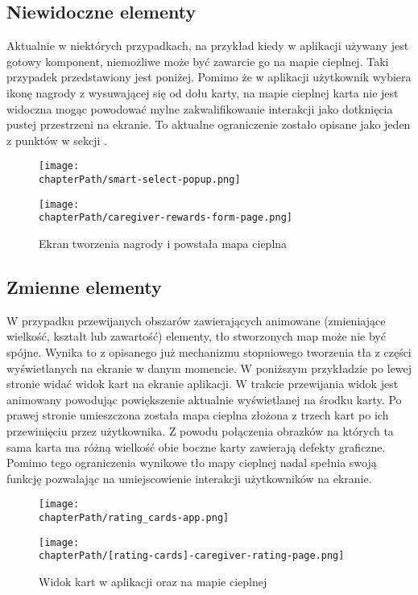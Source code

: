 \subsection{Niewidoczne elementy}
Aktualnie w niektórych przypadkach, na przykład kiedy w aplikacji używany jest gotowy komponent, niemożliwe może być zawarcie go na mapie cieplnej. Taki przypadek przedstawiony jest poniżej. Pomimo że w aplikacji użytkownik wybiera ikonę nagrody z wysuwającej się od dołu karty, na mapie cieplnej karta nie jest widoczna mogąc powodować mylne zakwalifikowanie interakcji jako dotknięcia pustej przestrzeni na ekranie. To aktualne ograniczenie zostało opisane jako jeden z punktów w sekcji .

\bigskip
\begin{figure}[H]
\centering
\begin{minipage}{.3\textwidth}
	\centering
	\texttt{[image: \\chapterPath/smart-select-popup.png]}
\end{minipage}
\begin{minipage}{.3\textwidth}
	\centering
	\texttt{[image: \\chapterPath/caregiver-rewards-form-page.png]}
\end{minipage}
\bigskip
\caption{Ekran tworzenia nagrody i powstała mapa cieplna}
\label{fig:rs_reward_form}
\end{figure}

\subsection{Zmienne elementy}
W przypadku przewijanych obszarów zawierających animowane (zmieniające wielkość, kształt lub zawartość) elementy, tło stworzonych map może nie być spójne. Wynika to z opisanego już mechanizmu stopniowego tworzenia tła z części wyświetlanych na ekranie w danym momencie. W poniższym przykładzie po lewej stronie widać widok kart na ekranie aplikacji. W trakcie przewijania widok jest animowany powodując powiększenie aktualnie wyświetlanej na środku karty. Po prawej stronie umieszczona została mapa cieplna złożona z trzech kart po ich przewinięciu przez użytkownika. Z powodu połączenia obrazków na których ta sama karta ma różną wielkość obie boczne karty zawierają defekty graficzne. Pomimo tego ograniczenia wynikowe tło mapy cieplnej nadal spełnia swoją funkcję pozwalając na umiejscowienie interakcji użytkowników na ekranie.

\bigskip
\begin{figure}[H]
\begin{minipage}{.25\textwidth}
	\centering
	\texttt{[image: \\chapterPath/rating\_cards-app.png]}
\end{minipage}
\begin{minipage}{.74\textwidth}
	\centering
	\texttt{[image: \\chapterPath/[rating-cards]-caregiver-rating-page.png]}
\end{minipage}
\bigskip
\caption{Widok kart w aplikacji oraz na mapie cieplnej}
\label{fig:rs_rating_cards}
\end{figure}
